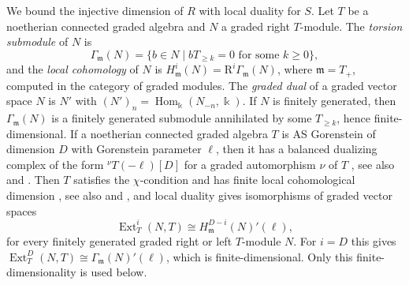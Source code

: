 \documentclass[reqno]{amsart}
\numberwithin{equation}{section}
\theoremstyle{definition}
\theoremstyle{remark}
\theoremstyle{plain}
\newcommand{\kk}{\Bbbk}
\DeclareMathOperator{\Ext}{Ext}
\DeclareMathOperator{\Hom}{Hom}
\begin{document}
We bound the injective dimension of $R$ with local duality for $S$. Let $T$ be a noetherian connected graded algebra and $N$ a graded right $T$-module. The \emph{torsion submodule} of $N$ is
\[
\Gamma_{\mathfrak m}(N)=\{b\in N\mid bT_{\ge k}=0\text{ for some }k\ge0\},
\]
and the \emph{local cohomology} of $N$ is $H^i_{\mathfrak m}(N)=\mathrm R^i\Gamma_{\mathfrak m}(N)$, where $\mathfrak m=T_+$, computed in the category of graded modules. The \emph{graded dual} of a graded vector space $N$ is $N'$ with $(N')_n=\Hom_\kk(N_{-n},\kk)$. If $N$ is finitely generated, then $\Gamma_{\mathfrak m}(N)$ is a finitely generated submodule annihilated by some $T_{\ge k}$, hence finite-dimensional. If a noetherian connected graded algebra $T$ is AS Gorenstein of dimension $D$ with Gorenstein parameter $\ell$, then it has a balanced dualizing complex of the form ${}^{\nu}T(-\ell)[D]$ for a graded automorphism $\nu$ of $T$ \cite[Section 4]{YZ}, see also \cite[Theorem 4.12]{LW} and \cite{Ye}. Then $T$ satisfies the $\chi$-condition and has finite local cohomological dimension \cite[Corollary 4.3]{YZ}, see also \cite[Corollary 4.13]{LW} and \cite[Theorem 6.3]{VdB}, and local duality \cite[Theorem 5.1]{VdB} gives isomorphisms of graded vector spaces
\begin{equation}\label{YAMe63Ld1}
\Ext^i_T(N,T)\cong H^{D-i}_{\mathfrak m}(N)'(\ell),
\end{equation}
for every finitely generated graded right or left $T$-module $N$. For $i=D$ this gives $\Ext^D_T(N,T)\cong\Gamma_{\mathfrak m}(N)'(\ell)$, which is finite-dimensional. Only this finite-dimensionality is used below.
\end{document}
